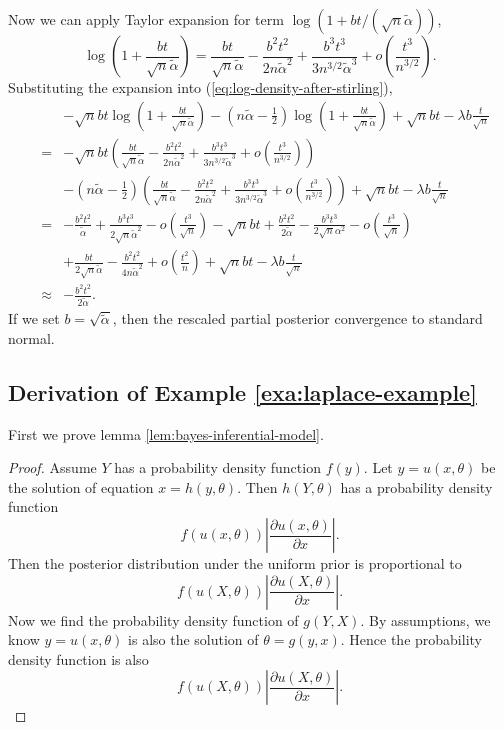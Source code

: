 \documentclass[oneside,english]{amsbook}
\numberwithin{section}{chapter}
\numberwithin{equation}{section}
\numberwithin{figure}{section}
\theoremstyle{plain}
\theoremstyle{plain}
\theoremstyle{definition}
\theoremstyle{plain}
\theoremstyle{plain}
\theoremstyle{remark}
\theoremstyle{definition}
\theoremstyle{definition}
\begin{document}
Now we can apply Taylor expansion for term $\log\left(1+bt/\left(\sqrt{n}\tilde{\alpha}\right)\right)$,
\[
\log\left(1+\frac{bt}{\sqrt{n}\tilde{\alpha}}\right)=\frac{bt}{\sqrt{n}\tilde{\alpha}}-\frac{b^{2}t^{2}}{2n\tilde{\alpha}^{2}}+\frac{b^{3}t^{3}}{3n^{3/2}\tilde{\alpha}^{3}}+o\left(\frac{t^{3}}{n^{3/2}}\right).
\]
Substituting the expansion into (\ref{eq:log-density-after-stirling}),
\begin{eqnarray*}
 &  & -\sqrt{n}bt\log\left(1+\frac{bt}{\sqrt{n}\tilde{\alpha}}\right)-\left(n\tilde{\alpha}-\frac{1}{2}\right)\log\left(1+\frac{bt}{\sqrt{n}\tilde{\alpha}}\right)+\sqrt{n}bt-\lambda b\frac{t}{\sqrt{n}}\\
 & = & -\sqrt{n}bt\left(\frac{bt}{\sqrt{n}\tilde{\alpha}}-\frac{b^{2}t^{2}}{2n\tilde{\alpha}^{2}}+\frac{b^{3}t^{3}}{3n^{3/2}\tilde{\alpha}^{3}}+o\left(\frac{t^{3}}{n^{3/2}}\right)\right)\\
 &  & -\left(n\tilde{\alpha}-\frac{1}{2}\right)\left(\frac{bt}{\sqrt{n}\tilde{\alpha}}-\frac{b^{2}t^{2}}{2n\tilde{\alpha}^{2}}+\frac{b^{3}t^{3}}{3n^{3/2}\tilde{\alpha}^{3}}+o\left(\frac{t^{3}}{n^{3/2}}\right)\right)+\sqrt{n}bt-\lambda b\frac{t}{\sqrt{n}}\\
 & = & -\frac{b^{2}t^{2}}{\tilde{\alpha}}+\frac{b^{3}t^{3}}{2\sqrt{n}\tilde{\alpha}^{2}}-o\left(\frac{t^{3}}{\sqrt{n}}\right)-\sqrt{n}bt+\frac{b^{2}t^{2}}{2\tilde{\alpha}}-\frac{b^{3}t^{3}}{2\sqrt{n}\alpha^{2}}-o\left(\frac{t^{3}}{\sqrt{n}}\right)\\
 &  & +\frac{bt}{2\sqrt{n}\tilde{\alpha}}-\frac{b^{2}t^{2}}{4n\tilde{\alpha}^{2}}+o\left(\frac{t^{2}}{n}\right)+\sqrt{n}bt-\lambda b\frac{t}{\sqrt{n}}\\
 & \approx & -\frac{b^{2}t^{2}}{2\tilde{\alpha}}.
\end{eqnarray*}
If we set $b=\sqrt{\tilde{\alpha}}$, then the rescaled partial posterior
convergence to standard normal.


\subsection{\label{sub:Derivation-of-Example-3}Derivation of Example \ref{exa:laplace-example}}

 {First we prove lemma \ref{lem:bayes-inferential-model}.}
\begin{proof}
 {Assume $Y$ has a probability density function $f\left(y\right)$.
Let $y=u\left(x,\theta\right)$ be the solution of equation $x=h\left(y,\theta\right)$.
Then $h\left(Y,\theta\right)$ has a probability density function
\[
f\left(u\left(x,\theta\right)\right)\left|\frac{\partial u\left(x,\theta\right)}{\partial x}\right|.
\]
Then the posterior distribution under the uniform prior is proportional
to 
\[
f\left(u\left(X,\theta\right)\right)\left|\frac{\partial u\left(X,\theta\right)}{\partial x}\right|.
\]
Now we find the probability density function of $g\left(Y,X\right)$.
By assumptions, we know $y=u\left(x,\theta\right)$ is also the solution
of $\theta=g\left(y,x\right)$. Hence the probability density function
is also 
\[
f\left(u\left(X,\theta\right)\right)\left|\frac{\partial u\left(X,\theta\right)}{\partial x}\right|.
\]
}
\end{proof}
\end{document}
